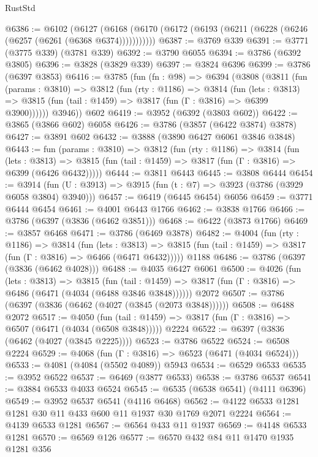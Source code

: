 \begin{lexlean}{RustStd}
\begin{coremodule}
@6386 := @6102
    (@6127 (@6168 (@6170 (@6172 (@6193 (@6211 (@6228 (@6246 (@6257 (@6261 (@6368 @6374)))))))))))
@6387 := @3769 @339
@6391 := @3771 (@3775 @339) (@3781 @339)
@6392 := @3790 @6055
@6394 := @3786 (@6392 @3805)
@6396 := @3828 (@3829 @339)
@6397 := @3824 @6396
@6399 := @3786 (@6397 @3853)
@6416 := @3785
    (fun (fn : @98) =>
    @6394
      (@3808
        (@3811
          (fun (params : @3810) =>
          @3812
            (fun (rty : @1186) =>
            @3814
              (fun (lets : @3813) =>
              @3815 (fun (tail : @1459) => @3817 (fun (Γ : @3816) => @6399 @3900))))))
        @3946))
    @602
@6419 := @3952 (@6392 (@3803 @602))
@6422 := @3865 (@3866 @602) @6058
@6426 := @3786 (@3857 (@6422 @3874) @3878)
@6427 := @3891 @602
@6432 := @3888 (@3890 @6427 @6061 @3846 @3848)
@6443 := fun (params : @3810) =>
  @3812
    (fun (rty : @1186) =>
    @3814
      (fun (lets : @3813) =>
      @3815 (fun (tail : @1459) => @3817 (fun (Γ : @3816) => @6399 (@6426 @6432)))))
@6444 := @3811 @6443
@6445 := @3808 @6444
@6454 := @3914 (fun (U : @3913) => @3915 (fun (t : @7) => @3923 (@3786 (@3929 @6058 @3804) @3940)))
@6457 := @6419 (@6445 @6454) @6056
@6459 := @3771 @6444 @6454
@6461 := @4001 @6443 @1766
@6462 := @3838 @1766
@6466 := @3786 (@6397 (@3836 (@6462 @3851)))
@6468 := @6422 (@3873 @1766)
@6469 := @3857 @6468
@6471 := @3786 (@6469 @3878)
@6482 := @4004
    (fun (rty : @1186) =>
    @3814
      (fun (lets : @3813) =>
      @3815 (fun (tail : @1459) => @3817 (fun (Γ : @3816) => @6466 (@6471 @6432)))))
    @1188
@6486 := @3786 (@6397 (@3836 (@6462 @4028)))
@6488 := @4035 @6427 @6061
@6500 := @4026
    (fun (lets : @3813) =>
    @3815
      (fun (tail : @1459) => @3817 (fun (Γ : @3816) => @6486 (@6471 (@4034 (@6488 @3846 @3848))))))
    @2072
@6507 := @3786 (@6397 (@3836 (@6462 (@4027 (@3845 (@2073 @3848))))))
@6508 := @6488 @2072
@6517 := @4050
    (fun (tail : @1459) => @3817 (fun (Γ : @3816) => @6507 (@6471 (@4034 (@6508 @3848)))))
    @2224
@6522 := @6397 (@3836 (@6462 (@4027 (@3845 @2225))))
@6523 := @3786 @6522
@6524 := @6508 @2224
@6529 := @4068 (fun (Γ : @3816) => @6523 (@6471 (@4034 @6524)))
@6533 := @4081 (@4084 (@5502 @4089)) @5943
@6534 := @6529 @6533
@6535 := @3952 @6522
@6537 := @6469 (@3877 @6533)
@6538 := @3786 @6537
@6541 := @3884 @6533 @4033 @6524
@6545 := @6535 (@6538 @6541) (@4111 @6396)
@6549 := @3952 @6537 @6541 (@4116 @6468)
@6562 := @4122 @6533 @1281 @1281 @30 @11 @433 @600 @11 @1937 @30 @1769 @2071 @2224
@6564 := @4139 @6533 @1281
@6567 := @6564 @433 @11 @1937
@6569 := @4148 @6533 @1281
@6570 := @6569 @126
@6577 := @6570 @432 @84 @11 @1470 @1935 @1281 @356

\end{coremodule}
\end{lexlean}
